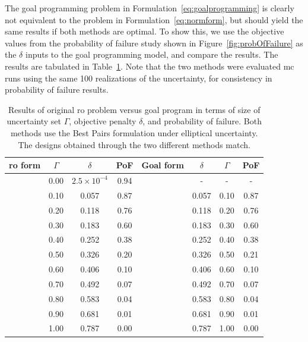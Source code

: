 The goal programming problem in Formulation~\ref{eq:goalprogramming} is clearly
not equivalent to the problem in Formulation~\ref{eq:normform},
but should yield the same results if both methods are optimal.
To show this, we use the objective values from the probability of failure study
shown in Figure~\ref{fig:probOfFailure} as the $\delta$ inputs to the goal programming model, and compare the results.
The results are tabulated in
Table~\ref{tab:deltaVsGamma}. Note that the two methods were evaluated \gls{mc} runs using the same 100 realizations
of the uncertainty, for consistency in probability of failure results.

\begin{table}
\begin{center}
\caption{\label{tab:deltaVsGamma} Results of original \gls{ro} problem versus goal program in terms
of size of uncertainty set $\Gamma$, objective penalty $\delta$, and probability of failure. Both methods
use the Best Pairs formulation under elliptical uncertainty. The designs obtained through
the two different methods match.}
\begin{tabular}{c c c c c c c c}
\hline
 \gls{ro} form & $\Gamma$ & $\delta$ & PoF & Goal form & $\delta$ & $\Gamma$ & PoF\\
\hline
& 0.00 & $2.5 \times 10^{-4}$ & 0.94 & & - & - & - \\
& 0.10 & 0.057 & 0.87 & & 0.057 & 0.10 & 0.87 \\
& 0.20 & 0.118 & 0.76 & & 0.118 & 0.20 & 0.76 \\
& 0.30 & 0.183 & 0.60 & & 0.183 & 0.30 & 0.60 \\
& 0.40 & 0.252 & 0.38 & & 0.252 & 0.40 & 0.38 \\
& 0.50 & 0.326 & 0.20 & & 0.326 & 0.50 & 0.21 \\
& 0.60 & 0.406 & 0.10 & & 0.406 & 0.60 & 0.10 \\
& 0.70 & 0.492 & 0.07 & & 0.492 & 0.70 & 0.07 \\
& 0.80 & 0.583 & 0.04 & & 0.583 & 0.80 & 0.04 \\
& 0.90 & 0.681 & 0.01 & & 0.681 & 0.90 & 0.01 \\
& 1.00 & 0.787 & 0.00 & & 0.787 & 1.00 & 0.00 \\
\end{tabular}
\end{center}
\end{table}

